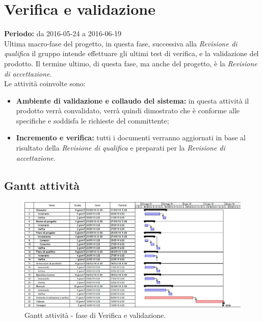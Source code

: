 \documentclass[a4paper]{report}
\begin{document}
		\section{Verifica e validazione}
			\textbf{Periodo:} da 2016-05-24 a 2016-06-19 \\
			Ultima macro-fase del progetto, in questa fase, successiva alla \emph{Revisione di qualifica} il gruppo 
			intende effettuare gli ultimi test di verifica, e la validazione del prodotto. Il termine ultimo, di questa 
			fase, ma anche del progetto, è la \emph{Revisione di accettazione}. \\ Le attività coinvolte sono:
			\begin{itemize}
				\item \textbf{Ambiente di validazione e collaudo del sistema:} in questa attività il prodotto verrà 
				convalidato, verrà quindi dimostrato che è conforme alle specifiche e soddisfa le richieste del committente;
				\item \textbf{Incremento e verifica:} tutti i documenti verranno aggiornati in base al risultato della 
				\emph{Revisione di qualifica} e preparati per la \emph{Revisione di accettazione}.
			\end{itemize}
			\subsection{Gantt attività}
				\begin{figure}[H]
					\centering
					\includegraphics[scale=0.4]{GanttValidazione}
					\caption{Gantt attività - fase di Verifica e validazione.}
				\end{figure}
\end{document}
